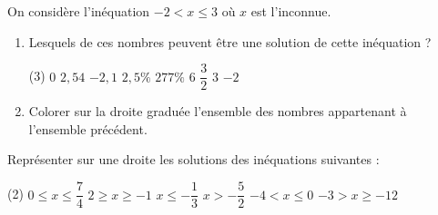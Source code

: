 \documentclass[10pt,a4paper]{article}
\begin{document}
\begin{exo}[][]

    On considère l'inéquation \(-2< x\leq 3\) où \(x\) est l'inconnue.
    \begin{enumerate}
        \item Lesquels de ces nombres peuvent être une solution de cette inéquation ? \begin{tasks}(3)
            \task \(0\)
            \task \(2,54\)
            \task \(-2,1\)
            \task \(2,5\%\)
            \task \(277\%\)
            \task \(6\)
            \task \(\dfrac{3}{2}\)
            \task \(3\)
            \task \(-2\)
        \end{tasks}
        \item Colorer sur la droite graduée l'ensemble des nombres appartenant à l'ensemble précédent.\\
        
    \end{enumerate}
\end{exo}


\begin{exo}[][]

    Représenter sur une droite  les solutions des inéquations suivantes :
    \begin{tasks}[after-item-skip =1cm](2)
        \task \(0\leq x \leq \dfrac{7}{4}\) 
        \task \(2\geq x \geq -1\)
        \task \(x \leq -\dfrac{1}{3}\) 
        \task \(x > -\dfrac{5}{2}\) 
        \task \(-4<x\leq 0\) 
        \task \(-3>x\geq -12\) 
    \end{tasks}
    \vspace{0.6cm}
\end{exo}
\end{document}
